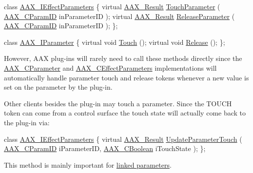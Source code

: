 \begin{DoxyCode}
\textcolor{keyword}{class }\hyperlink{a00099}{AAX\_IEffectParameters}
\{
    \textcolor{keyword}{virtual} \hyperlink{a00149_a4d8f69a697df7f70c3a8e9b8ee130d2f}{AAX\_Result} \hyperlink{a00061_ae82e80cbfd9cb837f8101a85f06856ba}{TouchParameter} ( \hyperlink{a00149_a1440c756fe5cb158b78193b2fc1780d1}{AAX\_CParamID} inParameterID );
    \textcolor{keyword}{virtual} \hyperlink{a00149_a4d8f69a697df7f70c3a8e9b8ee130d2f}{AAX\_Result} \hyperlink{a00061_a2caf1b7b8e2dad62cf96f144479dee60}{ReleaseParameter} ( \hyperlink{a00149_a1440c756fe5cb158b78193b2fc1780d1}{AAX\_CParamID} inParameterID 
      );
\};

\textcolor{keyword}{class }\hyperlink{a00108}{AAX\_IParameter}
\{
    \textcolor{keyword}{virtual} \textcolor{keywordtype}{void} \hyperlink{a00108_a74c71243313f9d817c8bcb77550969aa}{Touch} ();                     
    \textcolor{keyword}{virtual} \textcolor{keywordtype}{void} \hyperlink{a00108_a3d4869d9b6ec03d4f95f33f56479756f}{Release} ();
\};
\end{DoxyCode}


However, A\+A\+X plug-\/ins will rarely need to call these methods directly since the \hyperlink{a00033}{A\+A\+X\+\_\+\+C\+Parameter} and \hyperlink{a00018}{A\+A\+X\+\_\+\+C\+Effect\+Parameters} implementations will automatically handle parameter touch and release tokens whenever a new value is set on the parameter by the plug-\/in.

Other clients besides the plug-\/in may touch a parameter. Since the T\+O\+U\+C\+H token can come from a control surface the touch state will actually come back to the plug-\/in via\+:


\begin{DoxyCode}
\textcolor{keyword}{class }\hyperlink{a00099}{AAX\_IEffectParameters}
\{
    \textcolor{keyword}{virtual} \hyperlink{a00149_a4d8f69a697df7f70c3a8e9b8ee130d2f}{AAX\_Result} \hyperlink{a00061_a93483f44315bdf3adf60bf5bf773fbb8}{UpdateParameterTouch} ( 
      \hyperlink{a00149_a1440c756fe5cb158b78193b2fc1780d1}{AAX\_CParamID} iParameterID, \hyperlink{a00149_aa216506530f1d19a2965931ced2b274b}{AAX\_CBoolean} iTouchState );
\};
\end{DoxyCode}


This method is mainly important for \hyperlink{a00354}{linked parameters}.



